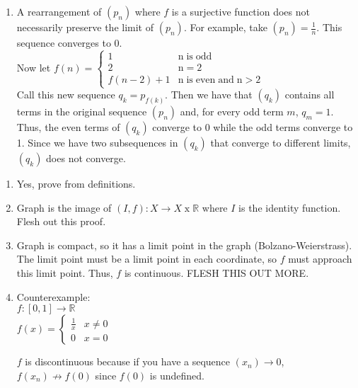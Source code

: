 \documentclass[12pt]{article}
\newenvironment{problem}[2][Problem]{\begin{trivlist}
\item[\hskip \labelsep {\bfseries #1}\hskip \labelsep {\bfseries #2.}]}{\end{trivlist}}
\begin{document}
\begin{enumerate}[label=(\alph*)]
	\item A rearrangement of $(p_n)$ where $f$ is a surjective function does not necessarily preserve the limit of $(p_n)$. For example, take $(p_n) = \frac{1}{n}$. This sequence converges to 0.\\
	
	Now let $f(n) = \begin{cases} 
      1 & \mathrm{n \; is \; odd}\\
      2 & \mathrm{n = 2}\\
      f(n-2)+1 & \mathrm{n \; is \; even \; and \; n > 2}
   \end{cases}$\\
   
   Call this new sequence $q_k = p_{f(k)}$. Then we have that $(q_k)$ contains all terms in the original sequence $(p_n)$ and, for every odd term $m$, $q_m = 1$. Thus, the even terms of $(q_k)$ converge to 0 while the odd terms converge to 1. Since we have two subsequences in $(q_k)$ that converge to different limits, $(q_k)$ does not converge.
\end{enumerate}

\begin{problem}{44 on p. 128}
\end{problem}

\begin{enumerate}[label=(\alph*)]
	\item Yes, prove from definitions.
	
	\item Graph is the image of $(I, f): X \to X \; \mathrm{x} \; \mathbb{R}$ where $I$ is the identity function. Flesh out this proof.
	
	\item Graph is compact, so it has a limit point in the graph (Bolzano-Weierstrass). The limit point must be a limit point in each coordinate, so $f$ must approach this limit point. Thus, $f$ is continuous. FLESH THIS OUT MORE.
	
	\item Counterexample:\\
	$f: [0, 1] \to \mathbb{R}$\\
	
	$f(x) = \begin{cases} 
      \frac{1}{x} & x \neq 0 \\
      0 & x = 0
   \end{cases}$
   
   $f$ is discontinuous because if you have a sequence $(x_n) \to 0$, $f(x_n) \not\to f(0)$ since $f(0)$ is undefined.
	
\end{enumerate}
\end{document}
